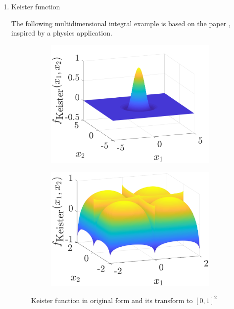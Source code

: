 \documentclass[twocolumn]{svjour3}          %
\begin{document}
\begin{enumerate}
\item Keister function

The following multidimensional integral example is based on the paper \cite{KeisterExample}, inspired by a physics application.


\begin{figure}[H]
\linespread{0.7}
\centering
\captionsetup[subfigure]{labelformat=empty}
\begin{subfigure}[b]{0.48\textwidth}
\includegraphics[width=\textwidth]{Keister_wholeR}
\end{subfigure}
\centering
\captionsetup[subfigure]{labelformat=empty}
\begin{subfigure}[b]{0.48\textwidth}
\includegraphics[width=\textwidth]{Keister_cube}
\end{subfigure}
\caption{Keister function in original form and its transform to $[0,1]^2$}
\label{fig:Keister}
\end{figure}



\end{enumerate}
\end{document}
